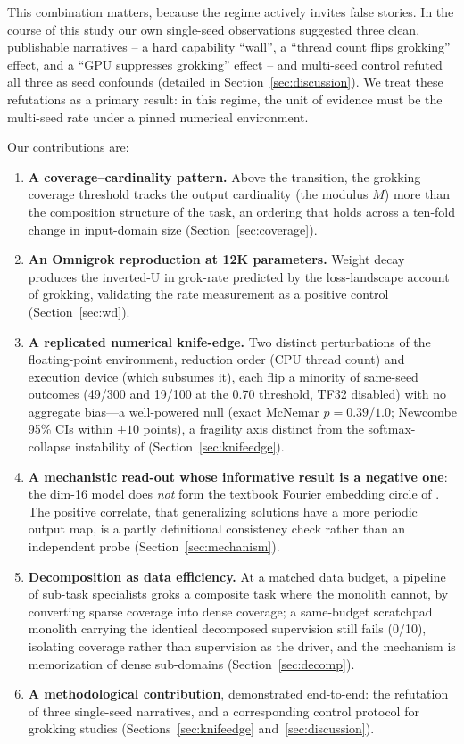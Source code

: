 \documentclass[10pt]{article} %
\begin{document}
This combination matters, because the regime actively invites false stories. In the course of
this study our own single-seed observations suggested three clean, publishable narratives -- a hard
capability ``wall'', a ``thread count flips grokking'' effect, and a ``GPU suppresses grokking''
effect -- and multi-seed control refuted all three as seed confounds
(detailed in Section~\ref{sec:discussion}). We treat these refutations as a primary result: in this regime, the unit of evidence must be the multi-seed rate
under a pinned numerical environment.

Our contributions are:
\begin{enumerate}
\item \textbf{A coverage--cardinality pattern.} Above the transition, the grokking coverage
threshold tracks the output cardinality (the modulus $M$) more than the composition structure of the
task, an ordering that holds across a ten-fold change in input-domain size (Section~\ref{sec:coverage}).
\item \textbf{An Omnigrok reproduction at 12K parameters.} Weight decay produces the inverted-U in
grok-rate predicted by the loss-landscape account of grokking, validating the rate measurement as
a positive control (Section~\ref{sec:wd}).
\item \textbf{A replicated numerical knife-edge.} Two distinct perturbations of the floating-point
environment, reduction order (CPU thread count) and execution device (which subsumes it), each flip
a minority of same-seed outcomes (49/300 and 19/100 at the 0.70 threshold, TF32 disabled) with no aggregate bias---a well-powered null (exact McNemar $p=0.39$/$1.0$; Newcombe 95\% CIs within $\pm10$ points), a fragility axis distinct from the
softmax-collapse instability of \citet{prieto2025edge} (Section~\ref{sec:knifeedge}).
\item \textbf{A mechanistic read-out whose informative result is a negative one}: the dim-16 model
does \emph{not} form the textbook Fourier embedding circle of \citet{nanda2023progress}. The
positive correlate, that generalizing solutions have a more periodic output map, is a partly
definitional consistency check rather than an independent probe (Section~\ref{sec:mechanism}).
\item \textbf{Decomposition as data efficiency.} At a matched data budget, a pipeline of sub-task
specialists groks a composite task where the monolith cannot, by converting sparse coverage into
dense coverage; a same-budget scratchpad monolith carrying the identical decomposed supervision
still fails (0/10), isolating coverage rather than supervision as the driver, and the mechanism is
memorization of dense sub-domains (Section~\ref{sec:decomp}).
\item \textbf{A methodological contribution}, demonstrated end-to-end: the refutation of three
single-seed narratives, and a corresponding control protocol for grokking studies
(Sections~\ref{sec:knifeedge} and~\ref{sec:discussion}).
\end{enumerate}
\end{document}
